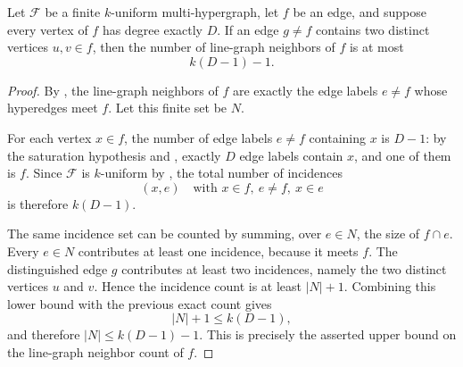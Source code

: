 \begin{helper}
Let $\mathcal F$ be a finite $k$-uniform multi-hypergraph, let $f$ be an
edge, and suppose every vertex of \(f\) has degree exactly \(D\).  If an
edge \(g\ne f\) contains two distinct vertices \(u,v\in f\), then the number
of line-graph neighbors of \(f\) is at most
\[
  k(D-1)-1 .
\]
\end{helper}
\begin{proof}
By , the line-graph neighbors of \(f\) are
exactly the edge labels \(e\ne f\) whose hyperedges meet \(f\).  Let this
finite set be \(N\).

For each vertex \(x\in f\), the number of edge labels \(e\ne f\) containing
\(x\) is \(D-1\): by the saturation hypothesis and
, exactly \(D\) edge labels contain \(x\), and one
of them is \(f\).  Since \(\mathcal F\) is \(k\)-uniform by
, the total number of incidences
\[
  (x,e)\quad\text{with }x\in f,\ e\ne f,\ x\in e
\]
is therefore \(k(D-1)\).

The same incidence set can be counted by summing, over \(e\in N\), the size of
\(f\cap e\).  Every \(e\in N\) contributes at least one incidence, because it
meets \(f\).  The distinguished edge \(g\) contributes at least two
incidences, namely the two distinct vertices \(u\) and \(v\).  Hence the
incidence count is at least \(|N|+1\).  Combining this lower bound with the
previous exact count gives
\[
  |N|+1 \le k(D-1),
\]
and therefore \(|N|\le k(D-1)-1\).  This is precisely the asserted upper
bound on the line-graph neighbor count of \(f\).
\end{proof}
